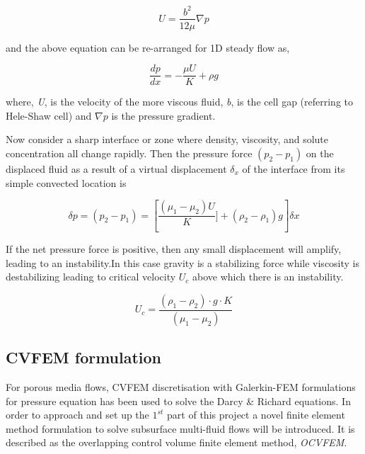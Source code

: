 \documentclass[12pt,a4paper,oneside]{report}%
\begin{document}
\begin{equation}
 U = \frac{b^2}{12 \mu} \nabla p
\end{equation}

and the above equation can be re-arranged for 1D steady flow as,

\begin{equation}
 \frac{dp}{dx}= - \frac{\mu U}{K} + \rho g 
\end{equation}

where, \textit{U}, is the velocity of the more viscous fluid, \textit{b}, is the cell gap (referring to Hele-Shaw cell) and \textit{$\nabla p$} is the pressure gradient.



Now consider a sharp interface or zone where density, viscosity, and solute concentration all change rapidly. Then the pressure force 
$(p_2 - p_1)$ on the displaced fluid as a result of a virtual displacement $\delta_x$ of the interface from its simple convected location is 

\begin{equation}
\delta p=(p_2-p_1)= \left[\frac{(\mu_1-\mu_2)U}{K}]+(\rho_2-\rho_1)g \right] \delta x
\end{equation}

If the net pressure force is positive, then any small displacement will amplify, leading to an instability.In this case gravity is a stabilizing force while viscosity is destabilizing leading to critical velocity $U_c$ above which there is an instability.

\begin{equation}
U_c = \frac{(\rho_1-\rho_2) \cdot g \cdot K}{(\mu_1-\mu_2)}
\end{equation} 

\subsection{CVFEM formulation}

For porous media flows, CVFEM discretisation with Galerkin-FEM formulations for pressure equation has been used to solve the Darcy \& Richard equations. In order to approach and set up the $1^{st}$ part of this project a novel finite element method formulation to solve subsurface multi-fluid flows will be introduced. It is described as the overlapping control volume finite element method, \textit{OCVFEM}. %
\end{document}
